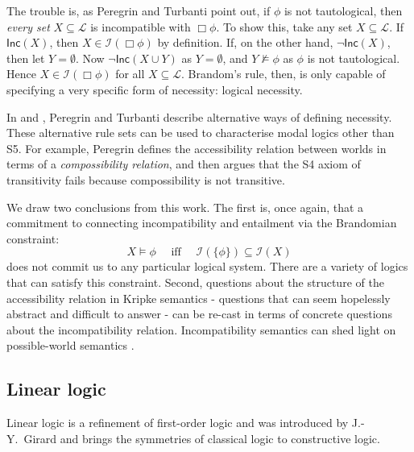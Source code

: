 The trouble is, as Peregrin and Turbanti point out, if $\phi$ is not tautological, then \emph{every set} $X \subseteq \mathcal{L}$ is incompatible with $\Box \phi$.
To show this, take any set $X \subseteq \mathcal{L}$. 
If $\mathsf{Inc}(X)$, then $X \in \mathcal{I}(\Box \phi)$ by definition.
If, on the other hand, $\neg \mathsf{Inc}(X)$, then let $Y = \emptyset$.
Now $\neg \mathsf{Inc}(X \cup Y)$ as $Y = \emptyset$, and $Y \nvDash \phi$ as $\phi$ is not tautological.
Hence $X \in \mathcal{I}(\Box \phi)$ for all $X \subseteq \mathcal{L}$. 
Brandom's rule, then, is only capable of specifying a very specific form of necessity: logical necessity.

In \cite{PeregrinJ:logbasoi} and \cite{turbanti}, Peregrin and Turbanti describe alternative ways of defining necessity.
These alternative rule sets can be used to characterise modal logics other than S5.
For example, Peregrin defines the accessibility relation between worlds in terms of a \emph{compossibility relation}, and then argues that the S4 axiom of transitivity fails because compossibility is not transitive.

We draw two conclusions from this work.
The first is, once again, that a commitment to connecting incompatibility and entailment via the Brandomian constraint:
\[
X \models \phi\quad \text{ iff }\quad \mathcal{I}(\{\phi\}) \subseteq \mathcal{I}(X)
\]
does not commit us to any particular logical system. 
There are a variety of logics that can satisfy this constraint.
Second, questions about the structure of the accessibility relation in Kripke semantics - questions that can seem hopelessly abstract and difficult to answer - can be re-cast in terms of concrete questions about the incompatibility relation.
Incompatibility semantics can shed light on possible-world semantics \cite{turbanti}. 

\subsection{Linear logic}

Linear logic \cite{GirardJY:linlog} is a refinement of
first-order logic and was introduced by J.-Y.~Girard and
brings the symmetries of classical logic to constructive
logic. 

